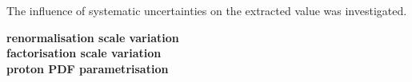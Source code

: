The influence of systematic uncertainties on the extracted \asz value was investigated.

\textbf{renormalisation scale variation}\\
\textbf{factorisation scale variation}\\
\textbf{proton PDF parametrisation} \newpage

